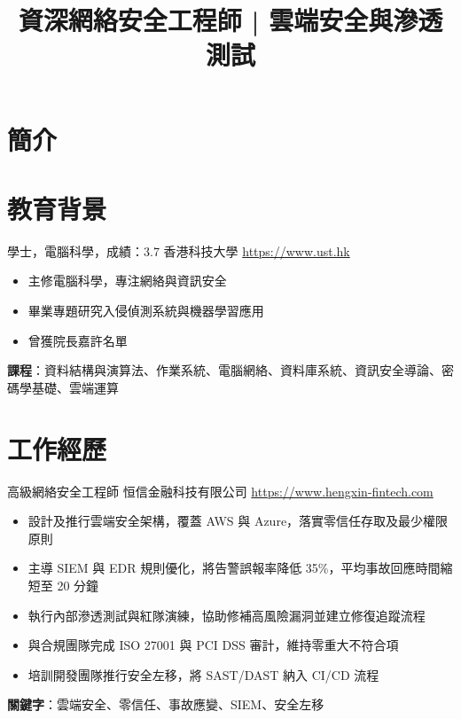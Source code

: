 \documentclass[a4paper, serif, 10pt]{moderncv}
\title{資深網絡安全工程師 | 雲端安全與滲透測試}
\begin{document}
\maketitle

\section{簡介}

\section{教育背景}

        {學士，電腦科學，成績：3.7}
        {香港科技大學}
        {\url{https://www.ust.hk}}
        {}
        {\begin{itemize}
\item 主修電腦科學，專注網絡與資訊安全
\item 畢業專題研究入侵偵測系統與機器學習應用
\item 曾獲院長嘉許名單
\end{itemize}
\textbf{課程}：資料結構與演算法、作業系統、電腦網絡、資料庫系統、資訊安全導論、密碼學基礎、雲端運算}
\section{工作經歷}

        {高級網絡安全工程師}
        {恒信金融科技有限公司}
        {\url{https://www.hengxin-fintech.com}}
        {}
        {\begin{itemize}
\item 設計及推行雲端安全架構，覆蓋 AWS 與 Azure，落實零信任存取及最少權限原則
\item 主導 SIEM 與 EDR 規則優化，將告警誤報率降低 35\%，平均事故回應時間縮短至 20 分鐘
\item 執行內部滲透測試與紅隊演練，協助修補高風險漏洞並建立修復追蹤流程
\item 與合規團隊完成 ISO 27001 與 PCI DSS 審計，維持零重大不符合項
\item 培訓開發團隊推行安全左移，將 SAST/DAST 納入 CI/CD 流程
\end{itemize}
\textbf{關鍵字}：雲端安全、零信任、事故應變、SIEM、安全左移}
\end{document}
